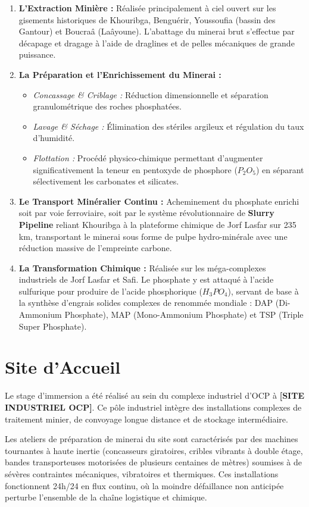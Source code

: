 \begin{enumerate}
    \item \textbf{L'Extraction Minière :} Réalisée principalement à ciel ouvert sur les gisements historiques de Khouribga, Benguérir, Youssoufia (bassin des Gantour) et Boucraâ (Laâyoune). L'abattage du minerai brut s'effectue par décapage et dragage à l'aide de draglines et de pelles mécaniques de grande puissance.
    \item \textbf{La Préparation et l'Enrichissement du Minerai :}
    \begin{itemize}
        \item \textit{Concassage \& Criblage :} Réduction dimensionnelle et séparation granulométrique des roches phosphatées.
        \item \textit{Lavage \& Séchage :} Élimination des stériles argileux et régulation du taux d'humidité.
        \item \textit{Flottation :} Procédé physico-chimique permettant d'augmenter significativement la teneur en pentoxyde de phosphore ($P_2O_5$) en séparant sélectivement les carbonates et silicates.
    \end{itemize}
    \item \textbf{Le Transport Minéralier Continu :} Acheminement du phosphate enrichi soit par voie ferroviaire, soit par le système révolutionnaire de \textbf{Slurry Pipeline} reliant Khouribga à la plateforme chimique de Jorf Lasfar sur 235\,km, transportant le minerai sous forme de pulpe hydro-minérale avec une réduction massive de l'empreinte carbone.
    \item \textbf{La Transformation Chimique :} Réalisée sur les méga-complexes industriels de Jorf Lasfar et Safi. Le phosphate y est attaqué à l'acide sulfurique pour produire de l'acide phosphorique ($H_3PO_4$), servant de base à la synthèse d'engrais solides complexes de renommée mondiale : DAP (Di-Ammonium Phosphate), MAP (Mono-Ammonium Phosphate) et TSP (Triple Super Phosphate).
\end{enumerate}

\section{Site d'Accueil}
Le stage d'immersion a été réalisé au sein du complexe industriel d'OCP à \textbf{[SITE INDUSTRIEL OCP]}. Ce pôle industriel intègre des installations complexes de traitement minier, de convoyage longue distance et de stockage intermédiaire.

Les ateliers de préparation de minerai du site sont caractérisés par des machines tournantes à haute inertie (concasseurs giratoires, cribles vibrants à double étage, bandes transporteuses motorisées de plusieurs centaines de mètres) soumises à de sévères contraintes mécaniques, vibratoires et thermiques. Ces installations fonctionnent 24h/24 en flux continu, où la moindre défaillance non anticipée perturbe l'ensemble de la chaîne logistique et chimique.

